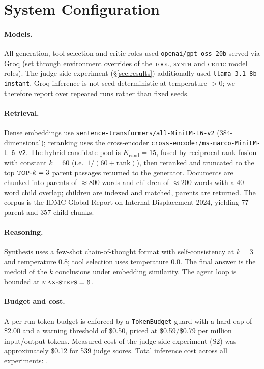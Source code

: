 
\section{System Configuration}
\label{app:system}

\paragraph{Models.}
All generation, tool-selection and critic roles used
\texttt{openai/gpt-oss-20b} served via Groq (set through environment overrides
of the \textsc{tool}, \textsc{synth} and \textsc{critic} model roles). The
judge-side experiment (\S\ref{sec:results}) additionally used
\texttt{llama-3.1-8b-instant}. Groq inference is not seed-deterministic at
temperature $>0$; we therefore report over repeated runs rather than fixed
seeds.

\paragraph{Retrieval.}
Dense embeddings use \texttt{sentence-transformers/all-MiniLM-L6-v2}
(384-dimensional); reranking uses the cross-encoder
\texttt{cross-encoder/ms-marco-MiniLM-L-6-v2}. The hybrid candidate pool is
$K_{\text{cand}}=15$, fused by reciprocal-rank fusion with constant $k=60$
(i.e.\ $1/(60+\mathrm{rank})$), then reranked and truncated to the top
$\textsc{top-}k=3$ parent passages returned to the generator. Documents are
chunked into parents of $\approx 800$ words and children of $\approx 200$ words
with a 40-word child overlap; children are indexed and matched, parents are
returned. The corpus is the IDMC Global Report on Internal Displacement 2024,
yielding 77 parent and 357 child chunks.

\paragraph{Reasoning.}
Synthesis uses a few-shot chain-of-thought format with self-consistency at
$k=3$ and temperature $0.8$; tool selection uses temperature $0.0$. The final
answer is the medoid of the $k$ conclusions under embedding similarity. The
agent loop is bounded at $\textsc{max-steps}=6$.

\paragraph{Budget and cost.}
A per-run token budget is enforced by a \texttt{TokenBudget} guard with a hard
cap of \$2.00 and a warning threshold of \$0.50, priced at
\$0.59/\$0.79 per million input/output tokens. Measured cost of the judge-side
experiment (S2) was approximately \$0.12 for 539 judge scores. Total inference
cost across all experiments: .
